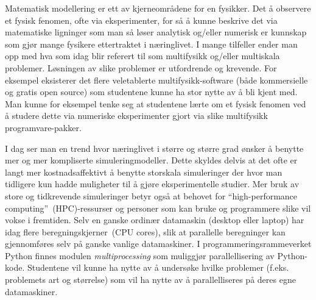 \documentclass{article}
\begin{document}
Matematisk modellering er ett av kjerneområdene for en fysikker. Det å observere et fysisk fenomen, ofte via eksperimenter, for så å kunne beskrive det via matematiske ligninger som man så løser analytisk og/eller numerisk er kunnskap som gjør mange fysikere ettertraktet i næringlivet. I mange tilfeller ender man opp med hva som idag blir referert til som multifysikk og/eller multiskala problemer. 
Løsningen av slike problemer er utfordrende og krevende. 
For eksempel eksisterer det flere veletablerte  multifysikk-software (både kommersielle og gratis open source) som studentene kunne ha stor nytte av å bli kjent med. 
Man kunne for eksempel tenke seg at studentene lærte om et fysisk fenomen ved å studere dette via numeriske eksperimenter gjort via slike multifysikk programvare-pakker.

I dag ser man en trend hvor næringlivet i større og større grad ønsker å benytte mer og mer kompliserte simuleringmodeller. Dette skyldes delvis at det ofte er langt mer kostnadsaffektivt å benytte storskala simuleringer der hvor man tidligere kun hadde muligheter til å gjøre eksperimentelle studier. Mer bruk av store og tidkrevende simuleringer betyr også at behovet for ``high-performance computing''~(HPC)-ressurser og personer som kan bruke og programmere slike vil vokse i fremtiden. Selv en ganske ordinær datamaskin (desktop eller laptop) har idag flere beregningskjerner~(CPU cores), slik at parallelle beregninger kan gjennomføres selv på ganske vanlige datamaskiner.
I programmeringsrammeverket Python finnes modulen \emph{multiprocessing} som muliggjør parallellisering av Python-kode.
Studentene vil kunne ha nytte av å undersøke hvilke problemer (f.eks. problemets art og størrelse) som vil ha nytte av å parallelliseres på deres egne datamaskiner.
\end{document}
